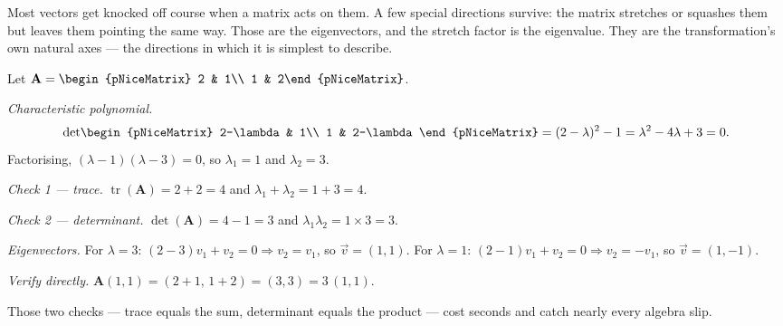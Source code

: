 \begin{plainlanguage}
Most vectors get knocked off course when a matrix acts on them. A few special
directions survive: the matrix stretches or squashes them but leaves them
pointing the same way. Those are the eigenvectors, and the stretch factor is
the eigenvalue. They are the transformation's own natural axes --- the
directions in which it is simplest to describe.
\end{plainlanguage}

\begin{workedexample}
Let $\mathbf{A} = \begin{pNiceMatrix} 2 & 1\\ 1 & 2\end{pNiceMatrix}$.

\emph{Characteristic polynomial.}
\[
  \det\!\begin{pNiceMatrix} 2-\lambda & 1\\ 1 & 2-\lambda\end{pNiceMatrix}
  = (2-\lambda)^2 - 1 = \lambda^2 - 4\lambda + 3 = 0 .
\]
Factorising, $(\lambda-1)(\lambda-3) = 0$, so $\lambda_1 = 1$ and
$\lambda_2 = 3$.

\emph{Check 1 --- trace.} $\operatorname{tr}(\mathbf{A}) = 2+2 = 4$ and
$\lambda_1+\lambda_2 = 1+3 = 4$. \checkmark

\emph{Check 2 --- determinant.} $\det(\mathbf{A}) = 4-1 = 3$ and
$\lambda_1\lambda_2 = 1\times3 = 3$. \checkmark

\emph{Eigenvectors.} For $\lambda=3$: $(2-3)v_1 + v_2 = 0 \Rightarrow v_2 = v_1$,
so $\vec{v} = (1,1)$. For $\lambda=1$: $(2-1)v_1 + v_2 = 0 \Rightarrow
v_2 = -v_1$, so $\vec{v} = (1,-1)$.

\emph{Verify directly.}
$\mathbf{A}(1,1) = (2+1,\,1+2) = (3,3) = 3\,(1,1)$. \checkmark

Those two checks --- trace equals the sum, determinant equals the product ---
cost seconds and catch nearly every algebra slip.
\end{workedexample}

